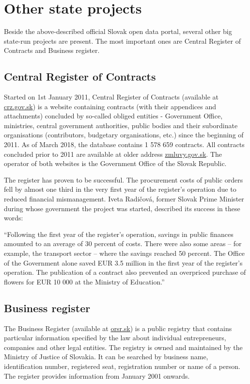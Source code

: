 \documentclass[thesis=B,english]{sprlajur-slovakopendata}[2018/05/12]
\begin{document}
\section{Other state projects}
Beside the above-described official Slovak open data portal, several other big state-run projects are present. The most important ones are Central Register of Contracts and Business register.
\subsection{Central Register of Contracts}
\label{crz}
Started on 1st January 2011, Central Register of Contracts (available at \href{https://www.crz.gov.sk}{crz.gov.sk}) is a website containing contracts (with their appendices and  attachments) concluded by so-called obliged entities - Government Office, ministries, central government authorities, public bodies and their subordinate organisations (contributors, budgetary organisations, etc.) since the beginning of 2011. As of March 2018, the database contains 1 578 659 contracts. All contracts concluded prior to 2011 are available at older address \href{http://www.zmluvy.gov.sk}{zmluvy.gov.sk}. The operator of both websites is the Government Office of the Slovak Republic. 
    	
The register has proven to be successful. The procurement costs of public orders fell by almost one third in the very first year of the register’s operation due to reduced financial mismanagement. Iveta Radičová, former Slovak Prime Minister during whose government the project was started, described its success in these words:
\begin{displayquote}“Following the first year of the register’s operation, savings in public finances amounted to an average of 30 percent of costs. There were also some areas – for example, the transport sector – where the savings reached 50 percent. The Office of the Government alone saved EUR 3.5 million in the first year of the register’s operation. The publication of a contract also prevented an overpriced purchase of flowers for EUR 10 000 at the Ministry of Education.”\cite{joinupcrz}
\end{displayquote}
\subsection{Business register}
\label{businessregister}
The Business Register (available at \href{http://www.orsr.sk}{orsr.sk}) is a public registry that contains particular information specified by the law about individual entrepreneurs, companies and other legal entities. The registry is owned and maintained by the Ministry of Justice of Slovakia. It can be searched by business name, identification number, registered seat, registration number or name of a person. The register provides information from January 2001 onwards.
\end{document}
